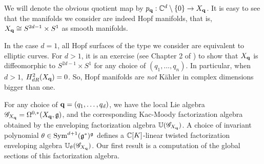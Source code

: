 We will denote the obvious quotient map by $p_{\bf q} : \mathbb C^d \setminus \{0\} \to X_{\bf q}$. 
It is easy to see that the manifolds we consider are indeed Hopf manifolds, that is, $X_{\bf q} \cong S^{2d-1} \times S^1$ as smooth manifolds.

\begin{rmk}
In the case $d=1$, all Hopf surfaces of the type we consider are equivalent to elliptic curves.
For $d>1$, it is an exercise (see Chapter 2 of \cite{KodairaDef}) to show that $X_{\bf q}$ is diffeomorphic to $S^{2d-1} \times S^1$ for any choice of $(q_1,\ldots,q_n)$. 
In particular, when $d > 1$, $H^{2}_{dR} (X_{\bf q}) = 0$.
So, Hopf manifolds are {\em not} K\"{a}hler in complex dimensions bigger than one. 
\end{rmk}


For any choice of ${\bf q} = (q_1,\ldots,q_d)$, we have the local Lie algebra $\mathscr G_{X_{\bf q}} = \Omega^{0,*}(X_{\bf q}, \mathfrak g)$, and the corresponding Kac-Moody factorization algebra obtained by the enveloping factorization algebra $\mathbb U(\mathscr G_{X_{\bf q}})$.
A choice of invariant polynomial $\theta \in {\rm Sym}^{d+1}(\mathfrak g^*)^\mathfrak g$ defines a $\mathbb C[K]$-linear twisted factorization enveloping algebra $\mathbb U_{\theta}(\mathscr G_{X_{\bf q}})$.  
Our first result is a computation of the global sections of this factorization algebra.  

